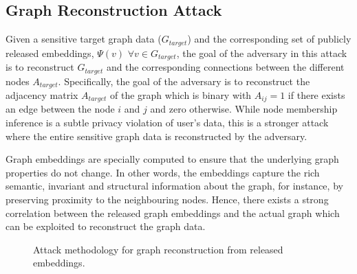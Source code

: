 \subsection{Graph Reconstruction Attack}

Given a sensitive target graph data ($G_{target}$) and the corresponding set of publicly released embeddings, $\Psi (v)$ $\forall v \in G_{target}$, the goal of the adversary in this attack is to reconstruct $G_{target}$ and the corresponding connections between the different nodes $A_{target}$.
Specifically, the goal of the adversary is to reconstruct the adjacency matrix $A_{target}$ of the graph which is binary with $A_{ij}=1$ if there exists an edge between the node $i$ and $j$ and zero otherwise.
While node membership inference is a subtle privacy violation of user's data, this is a stronger attack where the entire sensitive graph data is reconstructed by the adversary.

Graph embeddings are specially computed to ensure that the underlying graph properties do not change.
In other words, the embeddings capture the rich semantic, invariant and structural information about the graph, for instance, by preserving proximity to the neighbouring nodes.
Hence, there exists a strong correlation between the released graph embeddings and the actual graph which can be exploited to reconstruct the graph data.

\begin{figure}[!htb]
    \centering
    \begin{minipage}[b]{1\linewidth}
    \centering


    \end{minipage}
    \caption{Attack methodology for graph reconstruction from released embeddings.}
    \label{fig:recattack}
\end{figure}


